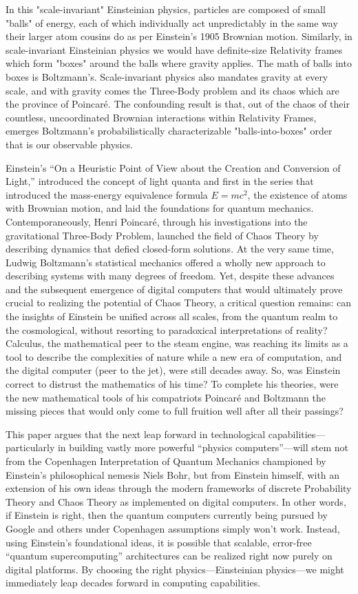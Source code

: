 \documentclass{article}
\begin{document}
In this "scale-invariant" Einsteinian physics, particles are composed of small "balls" of energy, each of which individually act unpredictably in the same way their larger atom cousins do as per Einstein's 1905 Brownian motion. Similarly, in scale-invariant Einsteinian physics we would have definite-size Relativity frames which form "boxes" around the balls where gravity applies. The math of balls into boxes is Boltzmann's. Scale-invariant physics also mandates gravity at every scale, and with gravity comes the Three-Body problem and its chaos which are the province of Poincar\'e. The confounding result is that, out of the chaos of their countless, uncoordinated Brownian interactions within Relativity Frames, emerges Boltzmann's probabilistically characterizable "balls-into-boxes" order that is our observable physics.

Einstein's “On a Heuristic Point of View about the Creation and Conversion of Light,” introduced the concept of light quanta and first in the series that introduced the mass-energy equivalence formula $E=mc^2$, the existence of atoms with Brownian motion, and laid the foundations for quantum mechanics. Contemporaneously, Henri Poincar\'e, through his investigations into the gravitational Three-Body Problem, launched the field of Chaos Theory by describing dynamics that defied closed-form solutions\cite{Poincare1890}. At the very same time, Ludwig Boltzmann's statistical mechanics offered a wholly new approach to describing systems with many degrees of freedom. Yet, despite these advances and the subsequent emergence of digital computers that would ultimately prove crucial to realizing the potential of Chaos Theory, a critical question remains: can the insights of Einstein be unified across all scales, from the quantum realm to the cosmological, without resorting to paradoxical interpretations of reality? Calculus, the mathematical peer to the steam engine, was reaching its limits as a tool to describe the complexities of nature while a new era of computation, and the digital computer (peer to the jet), were still decades away. So, was Einstein correct to distrust the mathematics of his time? To complete his theories, were the new mathematical tools of his compatriots Poincar\'e and Boltzmann the missing pieces that would only come to full fruition well after all their passings?

This paper argues that the next leap forward in technological capabilities—particularly in building vastly more powerful “physics computers”—will stem not from the Copenhagen Interpretation of Quantum Mechanics championed by Einstein's philosophical nemesis Niels Bohr, but from Einstein himself, with an extension of his own ideas through the modern frameworks of discrete Probability Theory and Chaos Theory as implemented on digital computers. In other words, if Einstein is right, then the quantum computers currently being pursued by Google and others under Copenhagen assumptions simply won't work. Instead, using Einstein’s foundational ideas, it is possible that scalable, error-free “quantum supercomputing” architectures can be realized right now purely on digital platforms. By choosing the right physics—Einsteinian physics—we might immediately leap decades forward in computing capabilities.
\end{document}
